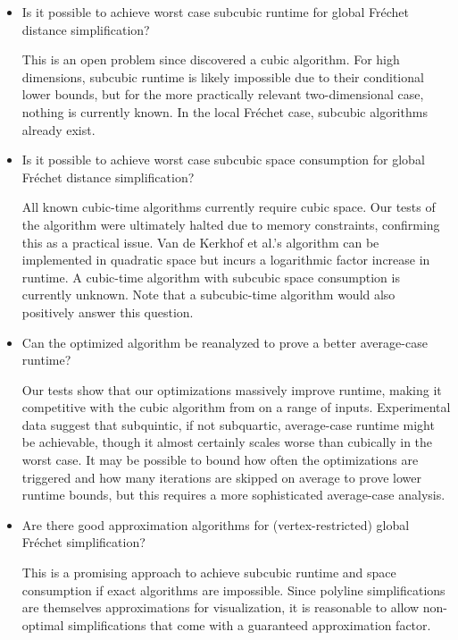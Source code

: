 \begin{itemize}
  \item Is it possible to achieve worst case subcubic runtime for global Fréchet distance simplification?

	This is an open problem since \citeauthor{polyline_simplification_has_cubic_complexity_bringmannetal} discovered a cubic algorithm. For high dimensions, subcubic runtime is likely impossible due to their conditional lower bounds, but for the more practically relevant two-dimensional case, nothing is currently known. In the local Fréchet case, subcubic algorithms already exist.

	\item Is it possible to achieve worst case subcubic space consumption for global Fréchet distance simplification?

	All known cubic-time algorithms currently require cubic space. Our tests of the \citeauthor{polyline_simplification_has_cubic_complexity_bringmannetal} algorithm were ultimately halted due to memory constraints, confirming this as a practical issue. Van de Kerkhof et al.'s algorithm can be implemented in quadratic space but incurs a logarithmic factor increase in runtime. A cubic-time algorithm with subcubic space consumption is currently unknown. Note that a subcubic-time algorithm would also positively answer this question.

	\item Can the optimized \citeauthor{on_optimal_polyline_simplification_using_the_hausdorff_and_frechet_distance} algorithm be reanalyzed to prove a better average-case runtime?

	Our tests show that our optimizations massively improve runtime, making it competitive with the cubic algorithm from \citeauthor{polyline_simplification_has_cubic_complexity_bringmannetal} on a range of inputs. Experimental data suggest that subquintic, if not subquartic, average-case runtime might be achievable, though it almost certainly scales worse than cubically in the worst case. It may be possible to bound how often the optimizations are triggered and how many iterations are skipped on average to prove lower runtime bounds, but this requires a more sophisticated average-case analysis.

	\item Are there good approximation algorithms for (vertex-restricted) global Fréchet simplification?

	This is a promising approach to achieve subcubic runtime and space consumption if exact algorithms are impossible. Since polyline simplifications are themselves approximations for visualization, it is reasonable to allow non-optimal simplifications that come with a guaranteed approximation factor.
	

\end{itemize}
